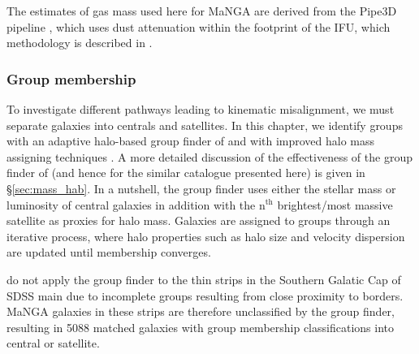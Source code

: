 The estimates of gas mass used here for MaNGA are derived from the Pipe3D pipeline \citep{pipe3Da, pipe3Dvac}, which uses dust attenuation within the footprint of the IFU, which methodology is described in \citet{barrera2018}.

\subsubsection{Group membership} \label{sec:group_def}
To investigate different pathways leading to kinematic misalignment, we must separate galaxies into centrals and satellites. In this chapter, we identify groups with an adaptive halo-based group finder of \citet{yang2005,yang2007} and with improved halo mass assigning techniques \citep[see;][for details and application to SDSS]{lim2017}. A more detailed discussion of the effectiveness of the group finder of \citep{yang2007} (and hence for the similar catalogue presented here) is given in \S\ref{sec:mass_hab}. In a nutshell, the group finder uses either the stellar mass or luminosity of central galaxies in addition with the $\mathrm{n^{th}}$ brightest/most massive satellite as proxies for halo mass. Galaxies are assigned to groups through an iterative process, where halo properties such as halo size and velocity dispersion are updated until membership converges. 

\citet{lim2017} do not apply the group finder to the thin strips in the Southern Galatic Cap of SDSS main due to incomplete groups resulting from close proximity to borders. MaNGA galaxies in these strips are therefore unclassified by the group finder, resulting in 5088 matched galaxies with group membership classifications into central or satellite. 


